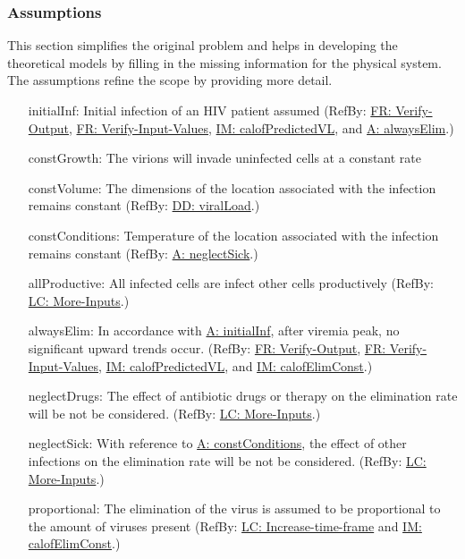 \documentclass[12pt]{article}
\begin{document}
\subsubsection{Assumptions}
\label{Sec:Assumps}
This section simplifies the original problem and helps in developing the theoretical models by filling in the missing information for the physical system. The assumptions refine the scope by providing more detail.

\begin{itemize}
\item[initialInf:\phantomsection\label{initialInf}]{Initial infection of an HIV patient assumed (RefBy: \hyperref[verifyOutput]{FR: Verify-Output}, \hyperref[verifyInput]{FR: Verify-Input-Values}, \hyperref[IM:calofPredictedVL]{IM: calofPredictedVL}, and \hyperref[alwaysElim]{A: alwaysElim}.)}
\item[constGrowth:\phantomsection\label{constGrowth}]{The virions will invade uninfected cells at a constant rate}
\item[constVolume:\phantomsection\label{constVolume}]{The dimensions of the location associated with the infection remains constant (RefBy: \hyperref[DD:viralLoad]{DD: viralLoad}.)}
\item[constConditions:\phantomsection\label{constConditions}]{Temperature of the location associated with the infection remains constant (RefBy: \hyperref[neglectSick]{A: neglectSick}.)}
\item[allProductive:\phantomsection\label{allProductive}]{All infected cells are infect other cells productively (RefBy: \hyperref[moreInputs]{LC: More-Inputs}.)}
\item[alwaysElim:\phantomsection\label{alwaysElim}]{In accordance with \hyperref[initialInf]{A: initialInf}, after viremia peak, no significant upward trends occur. (RefBy: \hyperref[verifyOutput]{FR: Verify-Output}, \hyperref[verifyInput]{FR: Verify-Input-Values}, \hyperref[IM:calofPredictedVL]{IM: calofPredictedVL}, and \hyperref[IM:calofElimConst]{IM: calofElimConst}.)}
\item[neglectDrugs:\phantomsection\label{neglectDrugs}]{The effect of antibiotic drugs or therapy on the elimination rate will be not be considered. (RefBy: \hyperref[moreInputs]{LC: More-Inputs}.)}
\item[neglectSick:\phantomsection\label{neglectSick}]{With reference to \hyperref[constConditions]{A: constConditions}, the effect of other infections on the elimination rate will be not be considered. (RefBy: \hyperref[moreInputs]{LC: More-Inputs}.)}
\item[proportional:\phantomsection\label{proportional}]{The elimination of the virus is assumed to be proportional to the amount of viruses present (RefBy: \hyperref[incTimeFrame]{LC: Increase-time-frame} and \hyperref[IM:calofElimConst]{IM: calofElimConst}.)}
\end{itemize}
\end{document}
